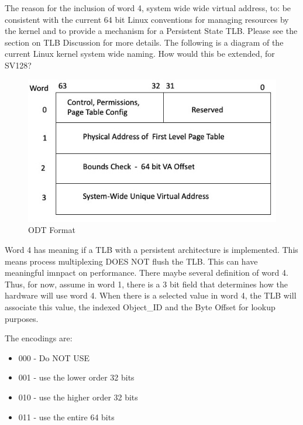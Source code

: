 \documentclass{article}
\begin{document}
The reason for the inclusion of word 4,  system wide wide virtual address, to:  be consistent with the current 64 bit Linux conventions for managing resources by the kernel and to provide a mechanism for a Persistent State TLB. Please see the section on TLB Discussion for more details.  The following is a diagram of the current Linux kernel system wide naming.  How would this be extended,  for SV128?

\begin{figure}[h]
\begin{center}
\includegraphics[scale=.8]{figures/2019_jan_ODT_structure.jpg}
\caption{ODT Format}
\label{fig:ODT}
\end{center}
\end{figure}

Word  4   has  meaning if a TLB with a persistent architecture is implemented.  This means process multiplexing DOES NOT  flush the TLB.  This can have meaningful imnpact on performance.  There maybe several   definition of word 4.  Thus,  for now, assume in word 1,  there is a 3 bit field that determines how the hardware will use word 4.  When there is a selected value in word 4,  the TLB will associate this value,  the indexed Object\_ID  and the Byte Offset for lookup purposes.

The encodings are: 

\begin{itemize}
    \item 000 - Do NOT USE
    \item 001 - use the lower order 32 bits
    \item 010 - use the higher order 32 bits
    \item 011 - use the entire 64 bits
\end{itemize}
\end{document}
